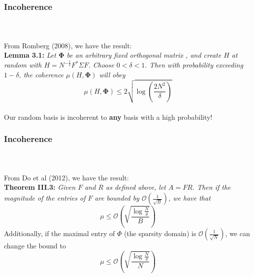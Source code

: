 \begin{frame}[t]
\frametitle{Incoherence}
\framesubtitle{~~}  %

From Romberg (2008), we have the result:\\

\textbf{Lemma 3.1:} \textit{Let $\boldsymbol{\Phi}$ be an arbitrary fixed orthogonal matrix
, and create $H$ at random with $H = N^{-\frac{1}{2}} F^* \Sigma F$. Choose $0<\delta<1$.
Then with probability exceeding $1-\delta$, the coherence $\mu(H,\boldsymbol{\Phi})$ 
will obey} \\
\begin{equation}
	\mu(H,\boldsymbol{\Phi}) \leq 2 \sqrt{\log \left(\frac{2N^2}{\delta} \right)}
	\label{incoherence_bd1}
\end{equation}
\\
Our random basis is incoherent to \textbf{any} basis with a high probability!

\end{frame}



\begin{frame}[t]
\frametitle{Incoherence}
\framesubtitle{~~}  %

From Do et al (2012), we have the result:\\

\textbf{Theorem III.3:} \textit{Given $F$ and $R$ as defined above, let $A=FR$. Then if the magnitude of the entries of $F$ are bounded by $\mathcal{O}(\frac{1}{\sqrt{B}})$, we have that}
\begin{equation}
	\mu \leq \mathcal{O}\left(\sqrt{\frac{\log{\frac{N}{\delta}}}{B}}\right)
\end{equation}
Additionally, if the maximal entry of $\Phi$ (the sparsity domain) is $\mathcal{O}\left(\frac{1}{\sqrt{N}}\right)$,
we can change the bound to 
\begin{equation}
	\label{incoherence_bd2}
	\mu \leq \mathcal{O} \left( \sqrt{\frac{\log{\frac{N}{\delta}}}{N}}\right)
\end{equation}

\end{frame}
